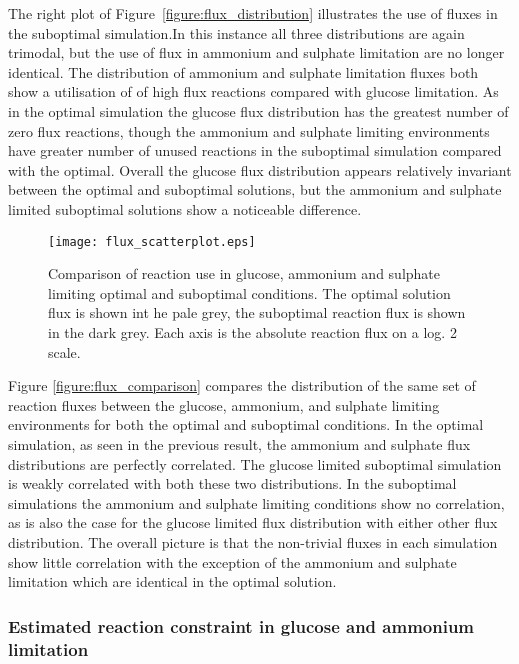 The right plot of Figure~\ref{figure:flux_distribution} illustrates the use of fluxes in the suboptimal simulation.In this instance all three distributions are again trimodal, but the use of flux in ammonium and sulphate limitation are no longer identical. The distribution of ammonium and sulphate limitation fluxes both show a utilisation of of high flux reactions compared with glucose limitation. As in the optimal simulation the glucose flux distribution has the greatest number of zero flux reactions, though the ammonium and sulphate limiting environments have greater number of unused reactions in the suboptimal simulation compared with the optimal. Overall the glucose flux distribution appears relatively invariant between the optimal and suboptimal solutions, but the ammonium and sulphate limited suboptimal solutions show a noticeable difference.

\begin{figure}%
  \centering
  \texttt{[image: flux\_scatterplot.eps]}
  \caption[Comparison of reaction use in glucose, ammonium and sulphate limitation]{Comparison of reaction use in glucose, ammonium and sulphate limiting optimal and suboptimal conditions. The optimal solution flux is shown int he pale grey, the suboptimal reaction flux is shown in the dark grey. Each axis is the absolute reaction flux on a log. 2 scale. }
  \label{figure:flux_comparison}
\end{figure}%

Figure \vref{figure:flux_comparison} compares the distribution of the same set of reaction fluxes between the glucose, ammonium, and sulphate limiting environments for both the optimal and suboptimal conditions. In the optimal simulation, as seen in the previous result, the ammonium and sulphate flux distributions are perfectly correlated. The glucose limited suboptimal simulation is weakly correlated with both these two distributions. In the suboptimal simulations the ammonium and sulphate limiting conditions show no correlation, as is also the case for the glucose limited flux distribution with either other flux distribution. The overall picture is that the non-trivial fluxes in each simulation show little correlation with the exception of the ammonium and sulphate limitation which are identical in the optimal solution.


\subsubsection{Estimated reaction constraint in glucose and ammonium limitation}%

